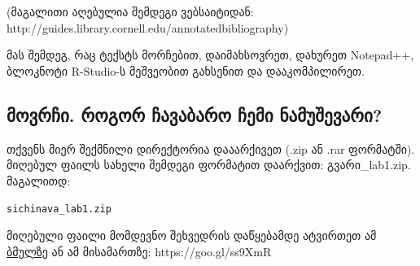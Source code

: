 \documentclass{article}\usepackage[]{graphicx}\usepackage[]{color}
\makeatletter
\newcommand{\hlstd}[1]{\textcolor[rgb]{0.345,0.345,0.345}{#1}}%
\newenvironment{kframe}{%
 \def\at@end@of@kframe{}%
 \ifinner\ifhmode%
  \def\at@end@of@kframe{\end{minipage}}%
  \begin{minipage}{\columnwidth}%
 \fi\fi%
 \def\FrameCommand##1{\hskip\@totalleftmargin \hskip-\fboxsep
 \colorbox{shadecolor}{##1}\hskip-\fboxsep
     \hskip-\linewidth \hskip-\@totalleftmargin \hskip\columnwidth}%
 \MakeFramed {\advance\hsize-\width
   \@totalleftmargin\z@ \linewidth\hsize
   \@setminipage}}%
 {\par\unskip\endMakeFramed%
 \at@end@of@kframe}
\newenvironment{knitrout}{}{} %
\makeatother
\begin{document}
(მაგალითი აღებულია შემდეგი ვებსაიტიდან: http://guides.library.cornell.edu/annotatedbibliography)

მას შემდეგ, რაც ტექსტს მორჩებით, დაიმახსოვრეთ, დახურეთ Notepad++, ბლოკნოტი R-Studio-ს მეშვეობით გახსენით და დააკომპილირეთ.

\subsection*{მოვრჩი. როგორ ჩავაბარო ჩემი ნამუშევარი?}

თქვენს მიერ შექმნილი დირექტორია დააარქივეთ (.zip ან .rar ფორმატში). მიღებულ ფაილს სახელი შემდეგი ფორმატით დაარქვით: გვარი\_lab1.zip. მაგალითდ:
\begin{knitrout}
\color{fgcolor}\begin{kframe}
\begin{alltt}
\hlstd{sichinava_lab1.zip}
\end{alltt}
\end{kframe}
\end{knitrout}

მიღებული ფაილი მომდევნო შეხვედრის დაწყებამდე ატვირთეთ ამ \href{https://www.dropbox.com/request/oUc9abSj2pWwLHgObGV7}{ბმულზე} ან ამ მისამართზე: https://goo.gl/ss9XmR
\end{document}
